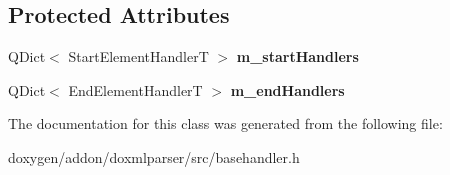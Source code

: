 \subsection*{Protected Attributes}
\begin{DoxyCompactItemize}
\item 
\mbox{\label{class_element_mapper_ac65b2d91a218457be0013a5b34ce6b60}} 
Q\+Dict$<$ Start\+Element\+HandlerT $>$ {\bfseries m\+\_\+start\+Handlers}
\item 
\mbox{\label{class_element_mapper_acc10714885fecc41c06efd87a3277b71}} 
Q\+Dict$<$ End\+Element\+HandlerT $>$ {\bfseries m\+\_\+end\+Handlers}
\end{DoxyCompactItemize}


The documentation for this class was generated from the following file\+:\begin{DoxyCompactItemize}
\item 
doxygen/addon/doxmlparser/src/basehandler.\+h\end{DoxyCompactItemize}
